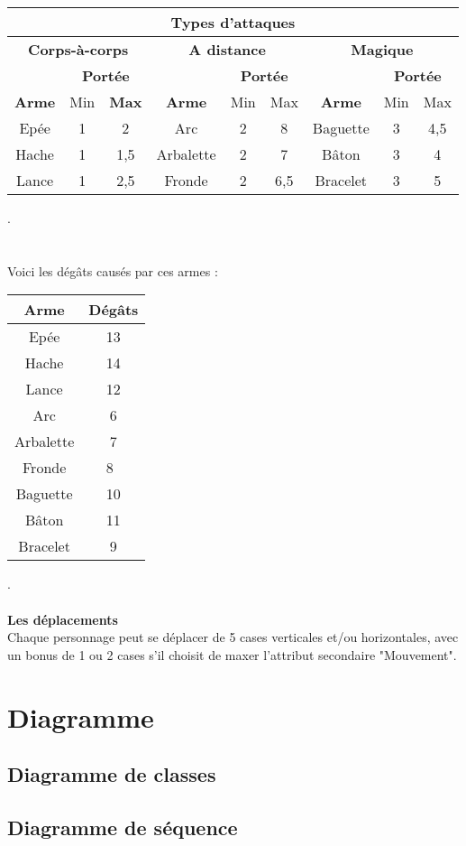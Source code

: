 \documentclass[a4paper,12pt]{report}
\begin{document}
	
	
	\begin{tabular}{|c|c|c|c|c|c|c|c|c|}
		\hline
		\multicolumn{9}{|c|}{Types d'attaques} \\
		\hline 
		\multicolumn{3}{|c|}{ \textbf{Corps-à-corps}} & 
		\multicolumn{3}{|c|}{ \textbf{A distance}}  & \multicolumn{3}{|c|}{\textbf{Magique}}\\
		\hline
		& \multicolumn{2}{|c|}{\textbf{Portée}} & & \multicolumn{2}{|c|}{\textbf{Portée}} & & \multicolumn{2}{|c|}{\textbf{Portée}} \\
		\hline
		\textbf{Arme} & Min & \textbf{Max} & \textbf{Arme}& Min & Max & \textbf{Arme}& Min & Max\\
		\hline 
		Epée & 1 & 2 & Arc & 2 & 8 & Baguette & 3 & 4,5 \\
		\hline
		Hache & 1 & 1,5 & Arbalette & 2 & 7 & Bâton & 3 & 4\\
		\hline
		Lance & 1 & 2,5 & Fronde & 2 & 6,5 &  Bracelet & 3 & 5 \\
		\hline

	\end{tabular}
	. \\ \\ \\
	Voici les dégâts causés par ces armes : \\ 
	\begin{center}
		\begin{tabular}{|c|c|}
			
			\hline
			Arme & Dégâts \\
			\hline
			Epée & 13 \\
			Hache & 14\\
			Lance & 12\\
			Arc & 6\\
			Arbalette & 7 \\
			Fronde & 8 \\
			Baguette & 10 \\
			Bâton & 11 \\
			Bracelet & 9 \\
			\hline
		\end{tabular}
	\end{center}
	.\\ \\
	\textbf{Les déplacements}\\
	
	Chaque personnage peut se déplacer de 5 cases verticales et/ou horizontales, avec un bonus de 1 ou 2 cases s'il choisit de maxer l'attribut secondaire "Mouvement".
	

	\section{Diagramme}
	
	\subsection{Diagramme de classes}

	\subsection{Diagramme de séquence}
	
	
\end{document}
